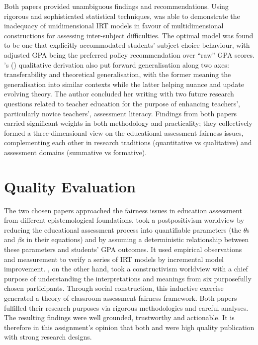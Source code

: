 \documentclass[
    a4paper,            %
    12pt,               %
    stu,                %
    noextraspace,       %
    floatsintext,       %
    biblatex,           %
    colorlinks=true,        %
    linkcolor=red,          %
    anchorcolor=black,      %
    citecolor=blue,         %
    urlcolor=blue,          %
    bookmarks=true,         %
    bookmarksopen=false,    %
    bookmarksnumbered=true  %
    margin=2cm              %
]{apa7}
\newcommand{\poscite}[1]{\citeauthor{#1}'s (\citeyear{#1})}
\begin{document}
Both papers provided unambiguous findings and recommendations. Using rigorous and sophisticated statistical techniques, \textcite{korobko:2008} was able to demonstrate the inadequacy of unidimensional IRT models in favour of multidimensional constructions for assessing inter-subject difficulties. The optimal model was found to be one that explicitly accommodated students' subject choice behaviour, with adjusted GPA being the preferred policy recommendation over ``raw'' GPA scores. \poscite{tierney:2014} qualitative derivation also put forward generalisation along two axes: transferability and theoretical generalisation, with the former meaning the generalisation into similar contexts while the latter helping nuance and update evolving theory. The author concluded her writing with two future research questions related to teacher education for the purpose of enhancing teachers', particularly novice teachers', assessment literacy. Findings from both papers carried significant weights in both methodology and practicality; they collectively formed a three-dimensional view on the educational assessment fairness issues, complementing each other in research traditions (quantitative vs qualitative) and assessment domains (summative vs formative).

\section{Quality Evaluation}

The two chosen papers approached the fairness issues in education assessment from different epistemological foundations. \textcite{korobko:2008} took a postpositivism worldview by reducing the educational assessment process into quantifiable parameters (the $\theta$s and $\beta$s in their equations) and by assuming a deterministic relationship between these parameters and students' GPA outcomes. It used empirical observations and measurement to verify a series of IRT models by incremental model improvement. \textcite{tierney:2014}, on the other hand, took a constructivism worldview with a chief purpose of understanding the interpretations and meanings from six purposefully chosen participants. Through social construction, this inductive exercise generated a theory of classroom assessment fairness framework. Both papers fulfilled their research purposes via rigorous methodologies and careful analyses. The resulting findings were well grounded, trustworthy and actionable. It is therefore in this assignment's opinion that both \textcite{korobko:2008} and \textcite{tierney:2014} were high quality publication with strong research designs.

\printbibliography
\end{document}
